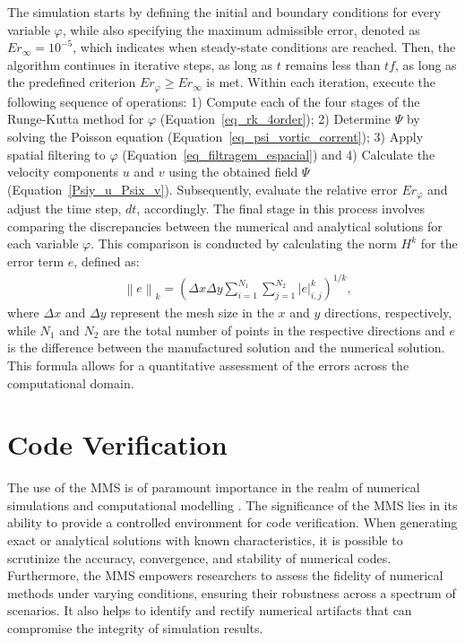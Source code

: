 \documentclass[preprint, 12pt]{elsarticle}
\begin{document}
The simulation starts by defining the initial and boundary conditions for every variable $\varphi$, while also specifying the maximum admissible error, denoted as $Er_{\infty} = 10^{-5}$, which indicates when steady-state conditions are reached. Then, the algorithm continues in iterative steps, as long as $t$ remains less than $tf$, as long as the predefined criterion $Er_{\varphi} \geq Er_{\infty}$ is met. Within each iteration, execute the following sequence of operations: 1) Compute each of the four stages of the Runge-Kutta method for $\varphi$ (Equation~\eqref{eq_rk_4order}); 2) Determine $\Psi$ by solving the Poisson equation (Equation~\eqref{eq_psi_vortic_corrent}); 3) Apply spatial filtering to $\varphi$ (Equation~\eqref{eq_filtragem_espacial}) and 4) Calculate the velocity components $u$ and $v$ using the obtained field $\Psi$ (Equation~\eqref{Psiy_u_Psix_v}). Subsequently, evaluate the relative error $Er_{\varphi}$ and adjust the time step, $dt$, accordingly. The final stage in this process involves comparing the discrepancies between the numerical and analytical solutions for each variable $\varphi$. This comparison is conducted by calculating the norm $H^k$ for the error term $e$, defined as:
\begin{align}
    &\left \|e\right \|_{k}=\left(\Delta x \Delta y \sum_{i=1}^{N_{1}}\sum_{j=1}^{N_{2}} \left |e\right |_{i,j}^{k}\right)^{1/k}, \label{norm_k}
\end{align}
where $\Delta x$ and $\Delta y$ represent the mesh size in the $x$ and $y$ directions, respectively, while $N_{1}$ and $N_{2}$ are the total number of points in the respective directions and $e$ is the difference between the manufactured solution and the numerical solution. This formula allows for a quantitative assessment of the errors across the computational domain.

\section{Code Verification}\label{sec_CodeVerification}

The use of the MMS is of paramount importance in the realm of numerical simulations and computational modelling \cite{Roy2004, Roy2001, Roache2002}. The significance of the MMS lies in its ability to provide a controlled environment for code verification. When generating exact or analytical solutions with known characteristics, it is possible to scrutinize the accuracy, convergence, and stability of numerical codes. Furthermore, the MMS empowers researchers to assess the fidelity of numerical methods under varying conditions, ensuring their robustness across a spectrum of scenarios. It also helps to identify and rectify numerical artifacts that can compromise the integrity of simulation results.
\end{document}
